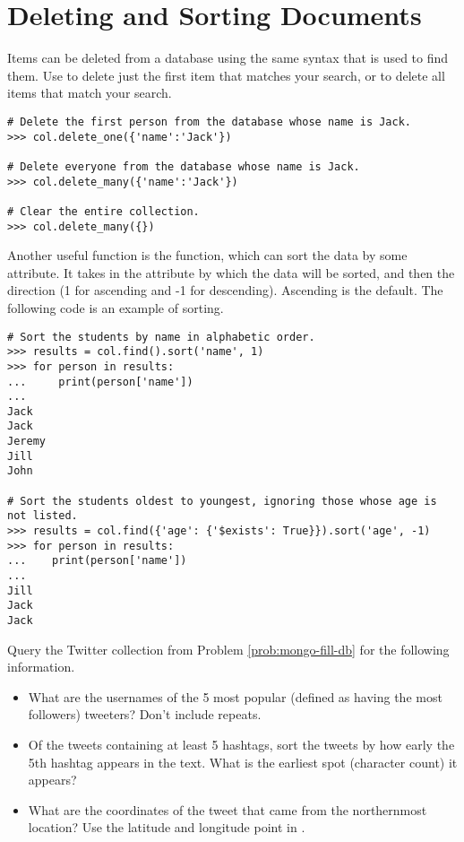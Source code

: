 \section*{Deleting and Sorting Documents}

Items can be deleted from a database using the same syntax that is used to find them. Use  to delete just the first item that matches your search, or  to delete all items that match your search.

\begin{lstlisting}
# Delete the first person from the database whose name is Jack.
>>> col.delete_one({'name':'Jack'})

# Delete everyone from the database whose name is Jack.
>>> col.delete_many({'name':'Jack'})

# Clear the entire collection.
>>> col.delete_many({})
\end{lstlisting}

Another useful function is the  function, which can sort the data by some attribute. It takes in the attribute by which the data will be sorted, and then the direction (1 for ascending and -1 for descending). Ascending is the default. The following code is an example of sorting.

\begin{lstlisting}
# Sort the students by name in alphabetic order.
>>> results = col.find().sort('name', 1)
>>> for person in results:
...     print(person['name'])
...
Jack
Jack
Jeremy
Jill
John

# Sort the students oldest to youngest, ignoring those whose age is not listed.
>>> results = col.find({'age': {'$exists': True}}).sort('age', -1)
>>> for person in results:
...    print(person['name'])
...
Jill
Jack
Jack
\end{lstlisting}

\begin{problem}
Query the Twitter collection from Problem \ref{prob:mongo-fill-db} for the following information.
\begin{itemize}
    \item What are the usernames of the 5 most popular (defined as having the most followers) tweeters? Don't include repeats.
    \item Of the tweets containing at least 5 hashtags, sort the tweets by how early the 5th hashtag appears in the text.
    What is the earliest spot (character count) it appears?
    \item What are the coordinates of the tweet that came from the northernmost location?
    Use the latitude and longitude point in .
\end{itemize}
\end{problem}

